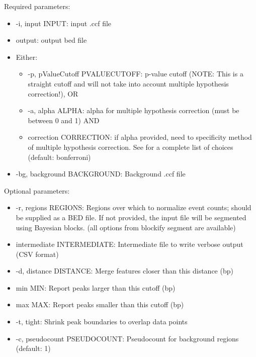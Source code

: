 \documentclass[letterpaper,10pt,english]{sphinxmanual}
\begin{document}
Required parameters:
\begin{itemize}
\item {} 
-i, \textendash{}input INPUT: input .ccf file

\item {} 
output: output bed file

\item {} 
Either:
\begin{itemize}
\item {} 
-p, \textendash{}pValueCutoff PVALUECUTOFF: p-value cutoff (NOTE: This is a straight cutoff and will not take into account multiple hypothesis correction!), OR

\item {} 
-a, \textendash{}alpha ALPHA: alpha for multiple hypothesis correction (must be between 0 and 1) AND

\item {} 
\textendash{}correction CORRECTION: if alpha provided, need to specificity method of multiple hypothesis correction. See  for a complete list of choices (default: bonferroni)

\end{itemize}

\item {} 
-bg, \textendash{}background BACKGROUND: Background .ccf file

\end{itemize}

Optional parameters:
\begin{itemize}
\item {} 
-r, \textendash{}regions REGIONS: Regions over which to normalize event counts; should be supplied as a BED file. If not provided, the input file will be segmented using Bayesian blocks. (all options from blockify segment are available)

\item {} 
\textendash{}intermediate INTERMEDIATE: Intermediate file to write verbose output (CSV format)

\item {} 
-d, \textendash{}distance DISTANCE: Merge features closer than this distance (bp)

\item {} 
\textendash{}min MIN: Report peaks larger than this cutoff (bp)

\item {} 
\textendash{}max MAX: Report peaks smaller than this cutoff (bp)

\item {} 
-t, \textendash{}tight: Shrink peak boundaries to overlap data points

\item {} 
-c, \textendash{}pseudocount PSEUDOCOUNT: Pseudocount for background regions (default: 1)

\end{itemize}
\end{document}
